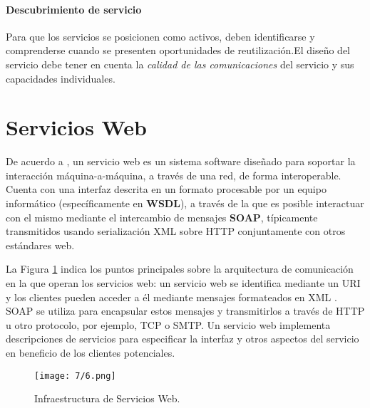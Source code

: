  	 \paragraph{Descubrimiento de servicio}
  
 	  Para que los servicios se posicionen como activos, deben identificarse y comprenderse cuando se presenten oportunidades de reutilización.El diseño del servicio debe tener en cuenta la \textit{\textit{calidad de las comunicaciones}} del servicio y sus capacidades individuales. 
 	  
 
 
  \section{Servicios Web}
   
   De acuerdo a , un \gls{servicio web} es un sistema software diseñado para soportar la interacción máquina-a-máquina, a través de una red, de forma interoperable. Cuenta con una interfaz descrita en un formato procesable por un equipo informático (específicamente en \textbf{WSDL}), a través de la que es posible interactuar con el mismo mediante el intercambio de mensajes \textbf{SOAP}, típicamente transmitidos usando serialización XML sobre HTTP conjuntamente con otros estándares web.
   
   La Figura \ref{fig:infraestructura} indica los puntos principales sobre la arquitectura de comunicación en la que operan los servicios web: un servicio web se identifica mediante un URI y los clientes pueden acceder a él mediante mensajes formateados en XML .    
   SOAP se utiliza para encapsular estos mensajes y transmitirlos a través de HTTP u otro protocolo, por ejemplo, TCP o SMTP. Un servicio web implementa descripciones de servicios para especificar la interfaz y otros aspectos del servicio en beneficio de los clientes potenciales.
    	
 \begin{figure}%
 	\texttt{[image: 7/6.png]}
 	\caption{Infraestructura de Servicios Web.}
 	\label{fig:infraestructura}
 \end{figure}
 
